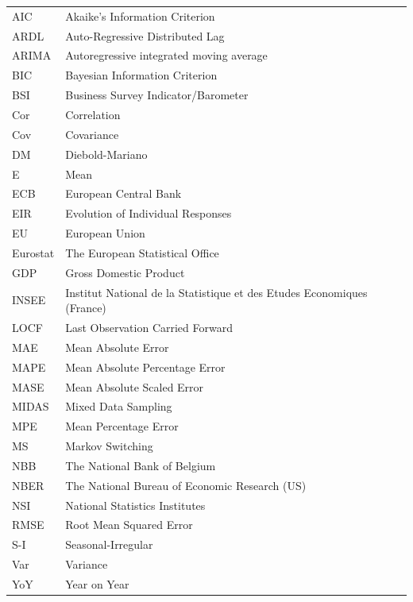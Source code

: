 \documentclass[12pt,a4paper,oneside]{book}
\begin{document}
\begin{tabular}{l l}
  AIC       & Akaike's Information Criterion \\
  ARDL      & Auto-Regressive Distributed Lag \\
  ARIMA     & Autoregressive integrated moving average \\
  BIC		& Bayesian Information Criterion \\
  BSI       & Business Survey Indicator/Barometer \\
  Cor       & Correlation \\
  Cov       & Covariance \\
  DM        & Diebold-Mariano \\
  E         & Mean \\
  ECB       & European Central Bank \\
  EIR       & Evolution of Individual Responses \\
  EU		& European Union \\
  Eurostat  & The European Statistical Office \\
  GDP       & Gross Domestic Product \\
  INSEE     & Institut National de la Statistique et des Etudes Economiques (France) \\
  LOCF 		& Last Observation Carried Forward \\
  MAE 		& Mean Absolute Error \\
  MAPE		& Mean Absolute Percentage Error \\
  MASE 		& Mean Absolute Scaled Error \\
  MIDAS     & Mixed Data Sampling \\
  MPE 		& Mean Percentage Error \\
  MS        & Markov Switching \\
  NBB       & The National Bank of Belgium \\
  NBER      & The National Bureau of Economic Research (US) \\
  NSI       & National Statistics Institutes \\
  RMSE 		& Root Mean Squared Error \\
  S-I       & Seasonal-Irregular \\
  Var       & Variance \\
  YoY       & Year on Year 
\end{tabular}

\tableofcontents

\newpage
\setcounter{page}{0}
\end{document}
